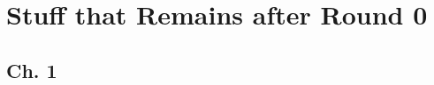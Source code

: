 





























%
\clearpage
\section{Stuff that Remains after Round 0}

\subsection{Ch. 1}






